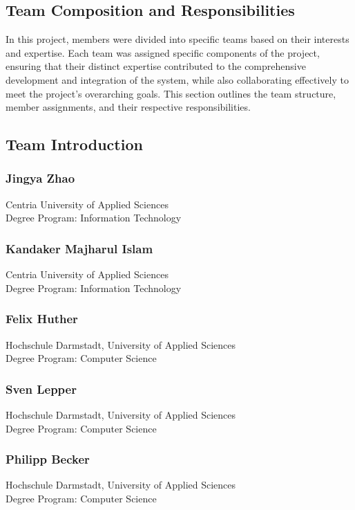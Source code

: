 \subsection{Team Composition and Responsibilities}
In this project, members were divided into specific teams based on their interests and expertise. Each team was assigned specific components of the project, ensuring that their distinct expertise contributed to the comprehensive development and integration of the system, while also collaborating effectively to meet the project's overarching goals. This section outlines the team structure, member assignments, and their respective responsibilities. 
\subsection{Team Introduction}
\subsubsection{Jingya Zhao}
Centria University of Applied Sciences \\
Degree Program: Information Technology

\subsubsection{Kandaker Majharul Islam}
Centria University of Applied Sciences \\
Degree Program: Information Technology

\subsubsection{Felix Huther}
Hochschule Darmstadt, University of Applied Sciences \\
Degree Program: Computer Science

\subsubsection{Sven Lepper}
Hochschule Darmstadt, University of Applied Sciences \\
Degree Program: Computer Science

\subsubsection{Philipp Becker}
Hochschule Darmstadt, University of Applied Sciences \\
Degree Program: Computer Science
\newpage
